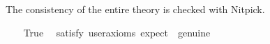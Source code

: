 \begin{isabellebody}
\endisatagproof
{\isafoldproof}%
%
\isadelimproof
%
\endisadelimproof
%
\begin{isamarkuptext}%
The consistency of the entire theory is checked with Nitpick.%
\end{isamarkuptext}%
\isamarkuptrue%
\ \ \isamarkupfalse%
\ True\ \isamarkupfalse%
\ {\isacharbrackleft}satisfy{\isacharcomma}\ user{\isacharunderscore}axioms{\isacharcomma}\ expect\ {\isacharequal}\ genuine{\isacharbrackright}%
\isadelimproof
\ %
\endisadelimproof
%
\isatagproof
{}\isamarkupfalse%
\ \isanewline
%
\endisatagproof
{\isafoldproof}%
%
\isadelimproof
%
\endisadelimproof
%
\isadelimtheory
%
\endisadelimtheory
%
\isatagtheory
%
\endisatagtheory
{\isafoldtheory}%
%
\isadelimtheory
%
\endisadelimtheory
\ \end{isabellebody}%

